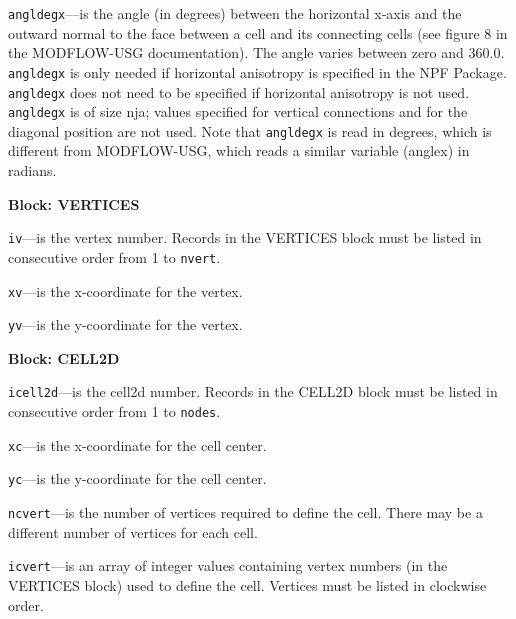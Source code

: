 \begin{description}
\item \texttt{angldegx}---is the angle (in degrees) between the horizontal x-axis and the outward normal to the face between a cell and its connecting cells (see figure 8 in the MODFLOW-USG documentation). The angle varies between zero and 360.0.  \texttt{angldegx} is only needed if horizontal anisotropy is specified in the NPF Package.  \texttt{angldegx} does not need to be specified if horizontal anisotropy is not used.  \texttt{angldegx} is of size nja; values specified for vertical connections and for the diagonal position are not used.  Note that \texttt{angldegx} is read in degrees, which is different from MODFLOW-USG, which reads a similar variable (anglex) in radians.

\end{description}
\item \textbf{Block: VERTICES}

\begin{description}
\item \texttt{iv}---is the vertex number.  Records in the VERTICES block must be listed in consecutive order from 1 to \texttt{nvert}.

\item \texttt{xv}---is the x-coordinate for the vertex.

\item \texttt{yv}---is the y-coordinate for the vertex.

\end{description}
\item \textbf{Block: CELL2D}

\begin{description}
\item \texttt{icell2d}---is the cell2d number.  Records in the CELL2D block must be listed in consecutive order from 1 to \texttt{nodes}.

\item \texttt{xc}---is the x-coordinate for the cell center.

\item \texttt{yc}---is the y-coordinate for the cell center.

\item \texttt{ncvert}---is the number of vertices required to define the cell.  There may be a different number of vertices for each cell.

\item \texttt{icvert}---is an array of integer values containing vertex numbers (in the VERTICES block) used to define the cell.  Vertices must be listed in clockwise order.

\end{description}

